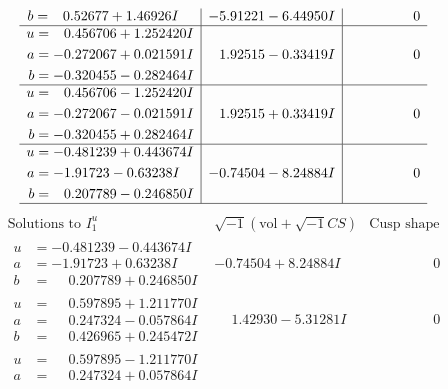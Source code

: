 \documentclass[1p]{elsarticle_modified}
\theoremstyle{definition}
\newcommand{\I}{\sqrt{-1}}
\begin{document}
$$\begin{array}{c|c|c}
\begin{aligned}
b &= \phantom{-}0.52677 + 1.46926 I\end{aligned}
 & -5.91221 - 6.44950 I & \phantom{-0.000000 } 0 \\ \hline\begin{aligned}
u &= \phantom{-}0.456706 + 1.252420 I \\
a &= -0.272067 + 0.021591 I \\
b &= -0.320455 - 0.282464 I\end{aligned}
 & \phantom{-}1.92515 - 0.33419 I & \phantom{-0.000000 } 0 \\ \hline\begin{aligned}
u &= \phantom{-}0.456706 - 1.252420 I \\
a &= -0.272067 - 0.021591 I \\
b &= -0.320455 + 0.282464 I\end{aligned}
 & \phantom{-}1.92515 + 0.33419 I & \phantom{-0.000000 } 0 \\ \hline\begin{aligned}
u &= -0.481239 + 0.443674 I \\
a &= -1.91723 - 0.63238 I \\
b &= \phantom{-}0.207789 - 0.246850 I\end{aligned}
 & -0.74504 - 8.24884 I & \phantom{-0.000000 } 0\\
 \hline 
 \end{array}$$\newpage$$\begin{array}{c|c|c}  
\text{Solutions to }I^u_{1}& \I (\text{vol} + \sqrt{-1}CS) & \text{Cusp shape}\\
 \hline 
\begin{aligned}
u &= -0.481239 - 0.443674 I \\
a &= -1.91723 + 0.63238 I \\
b &= \phantom{-}0.207789 + 0.246850 I\end{aligned}
 & -0.74504 + 8.24884 I & \phantom{-0.000000 } 0 \\ \hline\begin{aligned}
u &= \phantom{-}0.597895 + 1.211770 I \\
a &= \phantom{-}0.247324 - 0.057864 I \\
b &= \phantom{-}0.426965 + 0.245472 I\end{aligned}
 & \phantom{-}1.42930 - 5.31281 I & \phantom{-0.000000 } 0 \\ \hline\begin{aligned}
u &= \phantom{-}0.597895 - 1.211770 I \\
a &= \phantom{-}0.247324 + 0.057864 I \\

\end{aligned}
\end{array}$$
\end{document}

